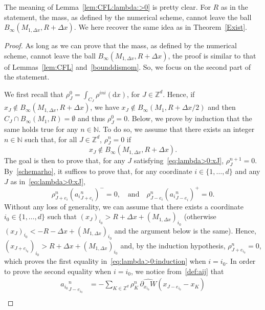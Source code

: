 \documentclass[11pt]{article}
\theoremstyle{definition}
\numberwithin{equation}{section}
\newcommand*{\dd}{\mathrm{d}}
\newcommand*{\dx}{\dd x}
\newcommand*\NN{\mathbb{N}}
\newcommand*\ZZ{\mathbb{Z}}
\newcommand*\pa{\partial}
\newcommand*\mIn{M_{1,\Delta x}}
\begin{document}
The meaning of Lemma~\ref{lem:CFL:lambda:>0} is pretty clear. For $R$ as in the statement, the mass, as defined by the numerical scheme, cannot leave the ball $B_{\infty}(\mIn{},R+\Delta x)$. We here recover the same idea as in Theorem~\ref{Exist}.

\begin{proof}
As long as we can prove that the mass, as defined by the numerical scheme, cannot leave the ball $B_{\infty}(\mIn{},R+\Delta x)$, the proof is similar to that of Lemmas~\ref{lem:CFL} and~\ref{bounddismom}. So, we focus on the second part of the statement.

We first recall that $\rho^0_{J} = \int_{C_{J}}\rho^{ini}(\dx)$, for $J \in \ZZ^d$. Hence, if $x_{J} \not \in B_{\infty}(\mIn{},R+\Delta x)$, we have $x_{J} \not \in B_{\infty}(M_{1},R+\Delta x/2)$ and then $C_{J} \cap B_{\infty}(M_{1},R) = \emptyset$ and thus $\rho^0_{J}=0$. Below, we prove by induction that the same holds true for any $n \in \NN$. To do so, we assume that there exists an integer $n \in \NN$ such that, for all $J \in \ZZ^d$, $\rho^n_{J} =0$ if
\begin{equation}\label{eq:lambda>0:xJ}
x_{J} \not \in B_{\infty}(\mIn{},R + \Delta x).
\end{equation}
The goal is then to prove that, for any $J$ satisfying~\eqref{eq:lambda>0:xJ}, $\rho^{n+1}_{J}=0$. By~\eqref{schemarho}, it suffices to prove that, for any coordinate $i \in \{1,\dots,d\}$ and any $J$ as in~\eqref{eq:lambda>0:xJ},
\begin{equation}\label{eq:lambda>0:induction}
\rho^{n}_{J+e_{i}} ({a_{i}}^n_{J+e_{i}})^- = 0,
\quad \text{and}
\quad
\rho^{n}_{J-e_{i}} ({a_{i}}^n_{J-e_{i}})^+ = 0.
\end{equation}
Without any loss of generality, we can assume that there exists a coordinate $i_{0} \in \{1,\dots,d\}$ such that $(x_{J})_{i_{0}} > R + \Delta x + (\mIn{})_{i_{0}}$ (otherwise $(x_{J})_{i_{0}} < -R - \Delta x+ (\mIn{})_{i_{0}}$ and the argument below is the same). Hence, $(x_{J+e_{i_{0}}})_{i_{0}} > R + \Delta x + (\mIn{})_{i_{0}}$ and, by the induction hypothesis, $\rho^n_{J+e_{i_{0}}}=0$, which proves the first equality in~\eqref{eq:lambda>0:induction} when $i=i_{0}$. In order to prove the second equality when $i=i_{0}$, we notice from~\eqref{def:aij} that
\begin{equation*}
\begin{split}
{a_{i_{0}}}^n_{J-e_{i_{0}}} & = -\sum_{K\in \ZZ^d} \rho_{K}^n \, \widehat{\pa_{x_{i_{0}}} W}(x_{J-e_{i_{0}}}-x_K ) \\

\end{split}
\end{equation*}
\end{proof}
\end{document}
